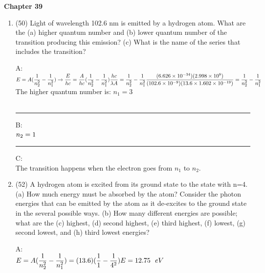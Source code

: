 \documentclass[fleqn]{article}
\begin{document}
  \textbf{Chapter 39}
  \begin{enumerate}
    \item (50) Light of wavelength 102.6 nm is emitted by a hydrogen
    atom. What are the (a) higher quantum number and (b) lower
    quantum number of the transition producing this emission? (c)
    What is the name of the series that includes the transition?

      \textcolor{hwColor}{
        A: \\
        $
          E=A(\dfrac{1}{n^2_2}-\dfrac{1}{n^2_1}) \rightarrow \dfrac{E}{hc}=\dfrac{A}{hc}(\dfrac{1}{n^2_2}-\dfrac{1}{n^2_1}) \\
          \\
          \dfrac{hc}{\lambda A}=\dfrac{1}{n^2_2}-\dfrac{1}{n^2_1} \\
          \\
          \dfrac{(6.626 \times 10^{-34})(2.998 \times 10^8)}{(102.6 \times 10^{-9})(13.6 \times 1.602 \times 10^{-19})}=\dfrac{1}{n^2_2}-\dfrac{1}{n^2_1} \\
          \\
        $
        The higher quantum number is: $n_1=3$ \\
        \\
      }

      \textcolor{hwColor}{ 
        \rule{16cm}{0.6pt} 
      } 

      \textcolor{hwColor}{
        B: \\
        $
          n_2=1 \\
          \\
        $
      }

      \textcolor{hwColor}{ 
        \rule{16cm}{0.6pt} 
      } 

      \textcolor{hwColor}{
        C: \\
        The transition happens when the electron goes from $n_1$ to $n_2$.
      }


    \item (52) A hydrogen atom is excited from its ground state to the state
    with n=4. (a) How much energy must be absorbed by the atom?
    Consider the photon energies that can be emitted by the atom as it
    de-excites to the ground state in the several possible ways. (b) How
    many different energies are possible; what are the (c) highest, (d)
    second highest, (e) third highest, (f) lowest, (g) second lowest, and
    (h) third lowest energies?

    \textcolor{hwColor}{
      A: \\
      $
        E=A(\dfrac{1}{n^2_2}-\dfrac{1}{n^2_1})=(13.6)(\dfrac{1}{1}-\dfrac{1}{4^2}) \\
        \\
        E=12.75 ~~ eV
      $
    }


\end{enumerate}
\end{document}
